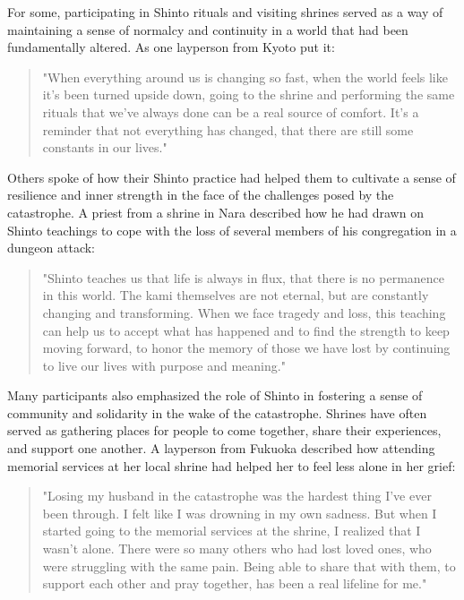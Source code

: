 \documentclass[12pt, a4paper]{article}
\begin{document}
For some, participating in Shinto rituals and visiting shrines served as a way of maintaining a sense of normalcy and continuity in a world that had been fundamentally altered. As one layperson from Kyoto put it:

\begin{quote}
"When everything around us is changing so fast, when the world feels like it's been turned upside down, going to the shrine and performing the same rituals that we've always done can be a real source of comfort. It's a reminder that not everything has changed, that there are still some constants in our lives."
\end{quote}

Others spoke of how their Shinto practice had helped them to cultivate a sense of resilience and inner strength in the face of the challenges posed by the catastrophe. A priest from a shrine in Nara described how he had drawn on Shinto teachings to cope with the loss of several members of his congregation in a dungeon attack:

\begin{quote}
"Shinto teaches us that life is always in flux, that there is no permanence in this world. The kami themselves are not eternal, but are constantly changing and transforming. When we face tragedy and loss, this teaching can help us to accept what has happened and to find the strength to keep moving forward, to honor the memory of those we have lost by continuing to live our lives with purpose and meaning."
\end{quote}

Many participants also emphasized the role of Shinto in fostering a sense of community and solidarity in the wake of the catastrophe. Shrines have often served as gathering places for people to come together, share their experiences, and support one another. A layperson from Fukuoka described how attending memorial services at her local shrine had helped her to feel less alone in her grief:

\begin{quote}
"Losing my husband in the catastrophe was the hardest thing I've ever been through. I felt like I was drowning in my own sadness. But when I started going to the memorial services at the shrine, I realized that I wasn't alone. There were so many others who had lost loved ones, who were struggling with the same pain. Being able to share that with them, to support each other and pray together, has been a real lifeline for me."
\end{quote}
\end{document}
